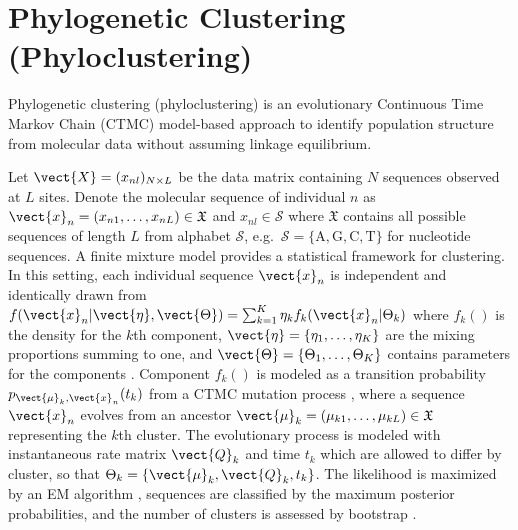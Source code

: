 \section[Phylogenetic Clustering (Phyloclustering)]{Phylogenetic Clustering (Phyloclustering)}
\label{sec:phyloclustering}

Phylogenetic clustering (phyloclustering) is an evolutionary
Continuous Time Markov Chain (CTMC) model-based approach to identify population
structure from molecular data without assuming linkage equilibrium.
\begin{comment}
The \pkg{phyclust} package provides a convenient implementation of
phyloclustering for DNA and SNP data, capable of clustering individuals into
subpopulations and identifying molecular sequences representative
of those subpopulations.
It is designed in \proglang{C} for performance,
interfaced with \proglang{R} for visualization,
and incorporates other popular open source software for
simulating data and additional analyses.
All aspects are intended to make the software useful to a broad
spectrum of biological users.
\end{comment}
Let $\vect{X} = (x_{nl})_{N\times L}$ be the data matrix containing
$N$ sequences observed at $L$ sites. Denote the molecular sequence
of individual $n$ as
$\vect{x}_n = (x_{n1}, \ldots, x_{nL}) \in \mathfrak{X}$ and
$x_{nl} \in \mathcal{S}$ where
$\mathfrak{X}$ contains all possible sequences of length $L$ from alphabet
$\mathcal{S}$, e.g.\ $\mathcal{S} = \{\mbox{A}, \mbox{G}, \mbox{C}, \mbox{T}\}$
for nucleotide sequences.
A finite mixture model provides a statistical framework for clustering.
In this setting, each individual sequence $\vect{x}_n$ is independent
and identically drawn from
$
f(\vect{x}_n | \vect{\eta}, \vect{\Theta}) =
\sum_{k = 1}^K \eta_k f_k(\vect{x}_n | \Theta_k)
$
where $f_k()$ is the density for the $k$th component,
$\vect{\eta} = \{\eta_1, \ldots, \eta_K\}$ are the mixing proportions
summing to one, and
$\vect{\Theta} = \{\Theta_1,\ldots,\Theta_K\}$ contains parameters for the
components \citep{Fraley2002}.
Component $f_k()$ is modeled as a transition probability
$p_{\vect{\mu}_k,\vect{x}_n}(t_k)$ from a CTMC mutation
process \citep{Felsenstein2004}, where
a sequence $\vect{x}_n$ evolves from
an ancestor
$\vect{\mu}_k = (\mu_{k1}, \ldots, \mu_{kL}) \in \mathfrak{X}$
representing the $k$th cluster.
The evolutionary process is modeled with instantaneous rate matrix
$\vect{Q}_k$ and time $t_k$
which are allowed to differ by cluster, so that
$\Theta_k = \{\vect{\mu}_k, \vect{Q}_k, t_k\}$.
The likelihood is maximized by an EM algorithm \citep{Dempster1977},
sequences are classified
by the maximum posterior probabilities, and the number of clusters is
assessed by bootstrap \citep{Maitra2010}.

